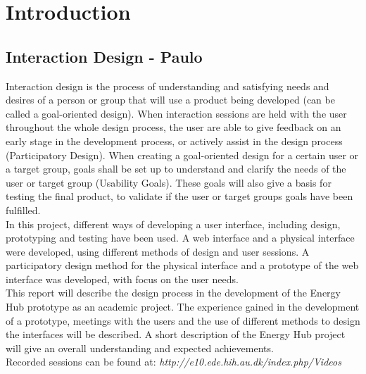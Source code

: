 \chapter{Introduction}
\section{Interaction Design - Paulo}
Interaction design is the process of understanding and satisfying needs and desires of a person or group that will use a product being developed (can be called a goal-oriented design). When interaction sessions are held with the user throughout the whole design process, the user are able to give feedback on an early stage in the development process, or actively assist in the design process (Participatory Design).
When creating a goal-oriented design for a certain user or a target group, goals shall be set up to understand and clarify the needs of the user or target group (Usability Goals). These goals will also give a basis for testing the final product, to validate if the user or target groups goals have been fulfilled.
\\[0.2cm]
In this project, different ways of developing a user interface, including design, prototyping and testing have been used.
A web interface and a physical interface were developed, using different methods of design and user sessions. A participatory design method for the physical interface and a prototype of the web interface was developed, with focus on the user needs.
\\[0.2cm]
This report will describe the design process in the development of the Energy Hub prototype as an academic project. The experience gained in the development of a prototype, meetings with the users and the use of different methods to design the interfaces will be described. A short description of the Energy Hub project will give an overall understanding and expected achievements.
\\[0.5cm]
Recorded sessions can be found at: \textit{http://e10.ede.hih.au.dk/index.php/Videos}
